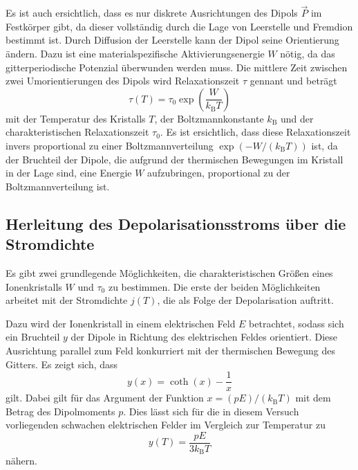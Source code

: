 Es ist auch ersichtlich, dass es nur diskrete Ausrichtungen des Dipols $\vec{P}$ im Festkörper gibt, da dieser vollständig durch die Lage von Leerstelle und Fremdion \cite{Was soll hier geändert werden? Was bedeutet IA? Ausdruck? Ich finde es ok...?} bestimmt ist. Durch Diffusion der Leerstelle kann der Dipol seine Orientierung ändern. Dazu ist eine materialspezifische Aktivierungsenergie $W$ nötig, da das gitterperiodische Potenzial überwunden werden muss. Die mittlere Zeit zwischen zwei Umorientierungen des Dipols wird Relaxationszeit $\tau$ gennant und beträgt
\begin{equation}
  \tau(T) = \tau_0 \exp\left(\frac{W}{k_{\text{B}}T}\right)
  \label{eqn:relaxtime}
\end{equation}
mit der Temperatur des Kristalls $T$, der Boltzmannkonstante $k_{\text{B}}$ und der charakteristischen Relaxationszeit $\tau_0$. Es ist ersichtlich, dass diese Relaxationszeit invers proportional zu einer Boltzmannverteilung $\exp(-W/(k_\text{B}T))$ ist, da der Bruchteil der Dipole, die aufgrund der thermischen Bewegungen im Kristall in der Lage sind, eine Energie $W$ aufzubringen, proportional zu der Boltzmannverteilung ist.

\subsection{Herleitung des Depolarisationsstroms über die Stromdichte}
Es gibt zwei grundlegende Möglichkeiten, die charakteristischen Größen eines Ionenkristalls $W$ und $\tau_0$ zu bestimmen. Die erste der beiden Möglichkeiten arbeitet mit der Stromdichte $j(T)$, die als Folge der Depolarisation auftritt.

Dazu wird der Ionenkristall in einem elektrischen Feld $E$ betrachtet, sodass sich ein Bruchteil $y$ der Dipole in Richtung des elektrischen Feldes orientiert. Diese Ausrichtung parallel zum Feld konkurriert mit der thermischen Bewegung des Gitters. Es zeigt sich, dass
\begin{equation}
  y(x) = \coth(x) - \frac{1}{x}
  \label{eqn:langevin}
\end{equation}
gilt. Dabei gilt für das Argument der Funktion $x=(pE)/(k_\text{B}T)$ mit dem Betrag des Dipolmoments $p$.
Dies lässt sich für die in diesem Versuch vorliegenden schwachen elektrischen Felder im Vergleich zur Temperatur zu
\begin{equation}
  y(T) = \frac{pE}{3k_\text{B}T}
  \label{eqn:yApprox}
\end{equation}
nähern.

